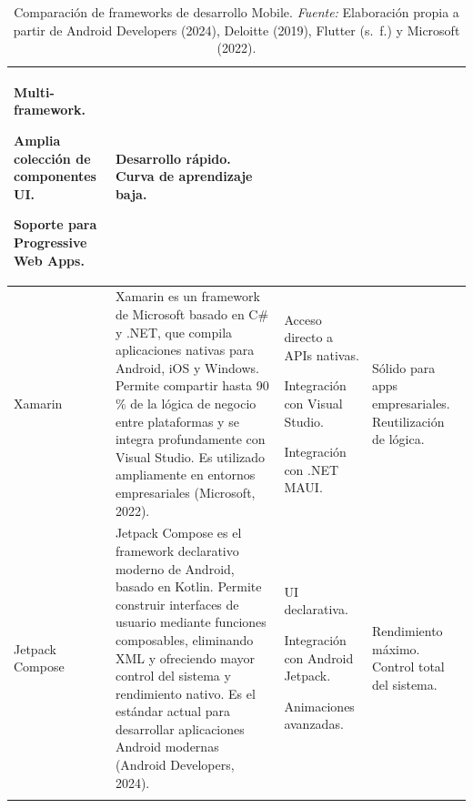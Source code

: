 {\begin{longtable}{|L{2.2cm}|L{5.55cm}|L{3.8cm}|L{2.7cm}|}
\begin{tablista}
  \item Multi-framework.
  \item Amplia colección de componentes UI.
  \item Soporte para Progressive Web Apps.
\end{tablista} &
Desarrollo rápido. Curva de aprendizaje baja. \\
\hline
Xamarin & Xamarin es un framework de Microsoft basado en C\# y .NET, que
compila aplicaciones nativas para Android, iOS y Windows. Permite compartir
hasta 90\,\% de la lógica de negocio entre plataformas y se integra
profundamente con Visual Studio. Es utilizado ampliamente en entornos
empresariales (Microsoft, 2022). &
\begin{tablista}
  \item Acceso directo a APIs nativas.
  \item Integración con Visual Studio.
  \item Integración con .NET MAUI.
\end{tablista} &
Sólido para apps empresariales. Reutilización de lógica. \\
\hline
Jetpack Compose & Jetpack Compose es el framework declarativo moderno de
Android, basado en Kotlin. Permite construir interfaces de usuario mediante
funciones composables, eliminando XML y ofreciendo mayor control del sistema y
rendimiento nativo. Es el estándar actual para desarrollar aplicaciones Android
modernas (Android Developers, 2024). &
\begin{tablista}
  \item UI declarativa.
  \item Integración con Android Jetpack.
  \item Animaciones avanzadas.
\end{tablista} &
Rendimiento máximo. Control total del sistema. \\ \hline
\caption[Comparación de frameworks de desarrollo Mobile]{Comparación de frameworks de desarrollo Mobile. \textit{Fuente:} Elaboración propia a partir de Android Developers (2024), Deloitte (2019), Flutter (s.~f.) y Microsoft (2022).}\label{tab:frameworks}\\
\end{longtable}
}



